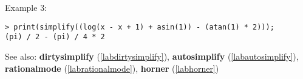 \noindent Example 3: 
\begin{center}\begin{minipage}{15cm}\begin{Verbatim}[frame=single,commandchars=\\\|\~]
> print(simplify((log(x - x + 1) + asin(1)) - (atan(1) * 2)));
(pi) / 2 - (pi) / 4 * 2
\end{Verbatim}
\end{minipage}\end{center}
See also: \textbf{dirtysimplify} (\ref{labdirtysimplify}), \textbf{autosimplify} (\ref{labautosimplify}), \textbf{rationalmode} (\ref{labrationalmode}), \textbf{horner} (\ref{labhorner})
